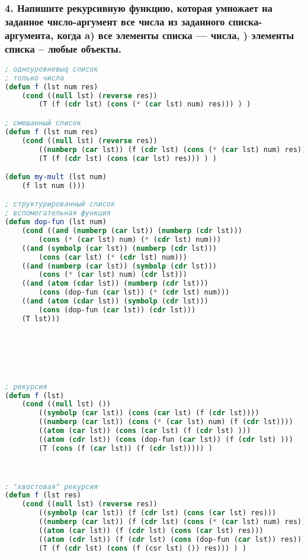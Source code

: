 \subsubsection*{4. Напишите рекурсивную функцию, которая умножает на заданное число-аргумент все числа из заданного списка-аргумента, когда \newline a) все элементы списка --- числа, ) элементы списка -- любые объекты.}
\begin{lstlisting}[language=Lisp]
; одноуровневыq список
; только числа
(defun f (lst num res)
	(cond ((null lst) (reverse res))
		(T (f (cdr lst) (cons (* (car lst) num) res))) ) )

; смешанный список
(defun f (lst num res)
	(cond ((null lst) (reverse res))
		((numberp (car lst)) (f (cdr lst) (cons (* (car lst) num) res)))
		(T (f (cdr lst) (cons (car lst) res))) ) )

(defun my-mult (lst num)
	(f lst num ()))

; структурированный список
; вспомогательная функция
(defun dop-fun (lst num)
	(cond ((and (numberp (car lst)) (numberp (cdr lst))) 
		(cons (* (car lst) num) (* (cdr lst) num)))
	((and (symbolp (car lst)) (numberp (cdr lst))) 
		(cons (car lst) (* (cdr lst) num)))
	((and (numberp (car lst)) (symbolp (cdr lst))) 
		(cons (* (car lst) num) (cdr lst)))
	((and (atom (cdar lst)) (numberp (cdr lst))) 
		(cons (dop-fun (car lst)) (* (cdr lst) num)))
	((and (atom (cdar lst)) (symbolp (cdr lst))) 
		(cons (dop-fun (car lst)) (cdr lst)))
	(T lst)))






; рекурсия
(defun f (lst)
	(cond ((null lst) ())
		((symbolp (car lst)) (cons (car lst) (f (cdr lst))))
		((numberp (car lst)) (cons (* (car lst) num) (f (cdr lst))))
		((atom (car lst)) (cons (car lst) (f (cdr lst) )))
		((atom (cdr lst)) (cons (dop-fun (car lst)) (f (cdr lst) )))
		(T (cons (f (car lst)) (f (cdr lst))))) )



; "хвостовая" рекурсия
(defun f (lst res)
	(cond ((null lst) (reverse res))
		((symbolp (car lst)) (f (cdr lst) (cons (car lst) res)))
		((numberp (car lst)) (f (cdr lst) (cons (* (car lst) num) res)))
		((atom (car lst)) (f (cdr lst) (cons (car lst) res)))
		((atom (cdr lst)) (f (cdr lst) (cons (dop-fun (car lst)) res)))
		(T (f (cdr lst) (cons (f (csr lst) ()) res))) ) )
		
	\end{lstlisting}


